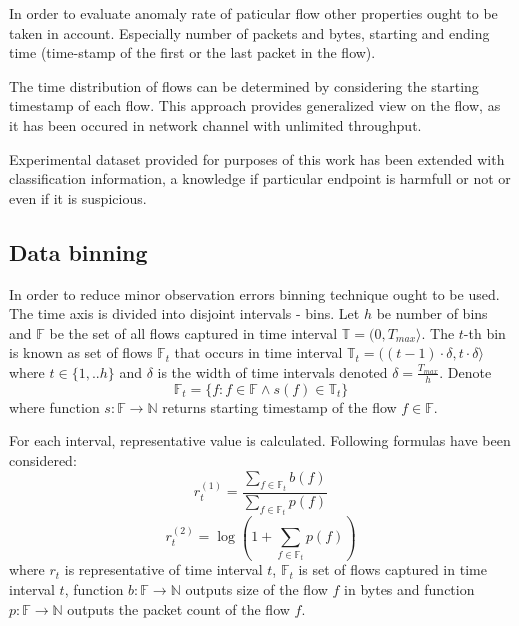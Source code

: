 In order to evaluate anomaly rate of paticular flow other properties ought to be taken in account. Especially number of packets and bytes, starting and ending time (time-stamp of the first or the last packet in the flow).

The time distribution of flows can be determined by considering the starting timestamp of each flow. This approach provides generalized view on the flow, as it has been occured in network channel with unlimited throughput.

Experimental dataset provided for purposes of this work has been extended with classification information, a knowledge if particular endpoint is harmfull or not or even if it is suspicious.

\subsection{Data binning}
In order to reduce minor observation errors binning technique ought to be used. The time axis is divided into disjoint intervals - bins. Let $h$ be number of bins and $\mathbb{F}$ be the set of all flows captured in time interval $\mathbb{T} = (0, T_{max}\rangle $. The $t$-th bin is known as  set of flows $\mathbb{F}_t$ that occurs in time interval $\mathbb{T}_t = ((t-1)\cdot \delta, t\cdot \delta\rangle $ where $t \in \{1, .. h\}$ and $\delta$ is the width of time intervals denoted $\delta = \frac{T_{max}}{h}$. Denote
\begin{equation}
\mathbb{F}_t = \{f : f \in \mathbb{F} \wedge s(f) \in \mathbb{T}_t \}
\end{equation}
where function $s:\mathbb{F} \rightarrow \mathbb{N} $ 
returns starting timestamp of the flow $f\in \mathbb{F}$.

For each interval,
representative value is calculated. Following formulas have been considered:
\begin{equation}
r_t^{(1)} = \frac{\sum\limits_{f\in \mathbb{F}_t}b(f)}{\sum\limits_{f\in \mathbb{F}_t}p(f)}
\end{equation}
\begin{equation}
r_t^{(2)} = \log(1+\sum\limits_{f\in \mathbb{F}_t}p(f))
\end{equation}
where $r_t$ is representative of time interval $t$, $\mathbb{F}_t$ is set of flows captured in time 
interval $t$, function $b:\mathbb{F} \rightarrow \mathbb{N}$ outputs size of the flow $f$ in bytes and function 
$p:\mathbb{F} \rightarrow \mathbb{N}$ outputs the packet count of the flow $f$.


